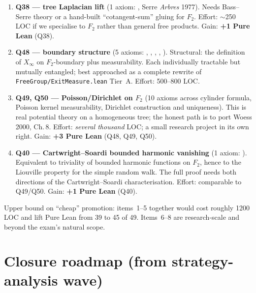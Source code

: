 \documentclass[11pt,a4paper]{article}
\newcommand{\lmod}[1]{\texttt{\small #1}}
\theoremstyle{plain}
\theoremstyle{definition}
\begin{document}
\begin{enumerate}[leftmargin=1.3em]
\item \textbf{Q38 --- tree Laplacian lift}
      (1 axiom: , Serre \emph{Arbres}
      1977). Needs Bass--Serre theory or a hand-built
      ``cotangent-sum'' gluing for $F_2$. Effort: $\sim$250 LOC if
      we specialise to $F_2$ rather than general free products.
      Gain: \textbf{+1 Pure Lean} (Q38).

\item \textbf{Q48 --- boundary structure}
      (5 axioms: ,
      , ,
      ,
      ).
      Structural: the definition of $X_\infty$ on $F_2$-boundary
      plus measurability. Each individually tractable but mutually
      entangled; best approached as a complete rewrite of
      \lmod{FreeGroup/ExitMeasure.lean} Tier~A. Effort: 500--800 LOC.

\item \textbf{Q49, Q50 --- Poisson/Dirichlet on $F_2$}
      (10 axioms across cylinder formula, Poisson kernel
      measurability, Dirichlet construction and uniqueness). This
      is real potential theory on a homogeneous tree; the honest
      path is to port Woess 2000, Ch.\,8. Effort: \emph{several
      thousand} LOC; a small research project in its own right.
      Gain: \textbf{+3 Pure Lean} (Q48, Q49, Q50).

\item \textbf{Q40 --- Cartwright--Soardi bounded harmonic vanishing}
      (1 axiom: ).
      Equivalent to triviality of bounded harmonic functions on
      $F_2$, hence to the Liouville property for the simple random
      walk. The full proof needs both directions of the
      Cartwright--Soardi characterisation. Effort: comparable to
      Q49/Q50. Gain: \textbf{+1 Pure Lean} (Q40).

\end{enumerate}

\noindent
Upper bound on ``cheap'' promotion: items~1--5 together would cost
roughly 1200 LOC and lift Pure Lean from 39 to 45 of 49. Items~6--8
are research-scale and beyond the exam's natural scope.

\section{Closure roadmap (from strategy-analysis wave)}\label{sec:roadmap}
\end{document}
